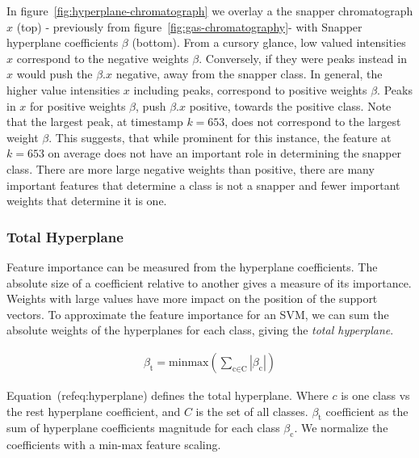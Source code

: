 \documentclass[runningheads]{llncs}
\begin{document}
In figure~\ref{fig:hyperplane-chromatograph} we overlay a the snapper chromatograph $x$ (top) - previously from figure~\ref{fig:gas-chromatography}- with Snapper hyperplane coefficients $\beta$ (bottom).
From a cursory glance, low valued intensities $x$ correspond to the negative weights $\beta$.
Conversely, if they were peaks instead in $x$ would push the $\beta . x$ negative, away from the snapper class. 
In general, the higher value intensities $x$ including peaks, correspond to positive weights $\beta$. 
Peaks in $x$ for positive weights $\beta$, push $\beta . x$ positive, towards the positive class. 
Note that the largest peak, at timestamp $k = 653$, does not correspond to the largest weight $\beta$. 
This suggests, that while prominent for this instance, the feature at $k = 653$ on average does not have an important role in determining the snapper class. 
There are more large negative weights than positive, there are many important features that determine a class is not a snapper and fewer important weights that determine it is one. 

\subsubsection{Total Hyperplane}

Feature importance can be measured from the hyperplane coefficients. 
The absolute size of a coefficient relative to another gives a measure of its importance. 
Weights with large values have more impact on the position of the support vectors. 
To approximate the feature importance for an SVM, we can sum the absolute weights of the hyperplanes for each class, giving the \emph{total hyperplane}. 

\begin{align}\label{eq:hyperplane}
  \beta_{\text{t}} = \text{minmax}(
  \sum_{\text{c} \in \text{C}}
  |\beta_{\text{c}}|
  )
\end{align}

Equation~(ref{eq:hyperplane}) defines the total hyperplane.
Where $c$ is one class vs the rest hyperplane coefficient, and $C$ is the set of all classes. 
$\beta_{\text{t}}$ coefficient as the sum of hyperplane coefficients magnitude for each class $\beta_{\text{c}}$.
We normalize the coefficients with a min-max feature scaling.
\end{document}
